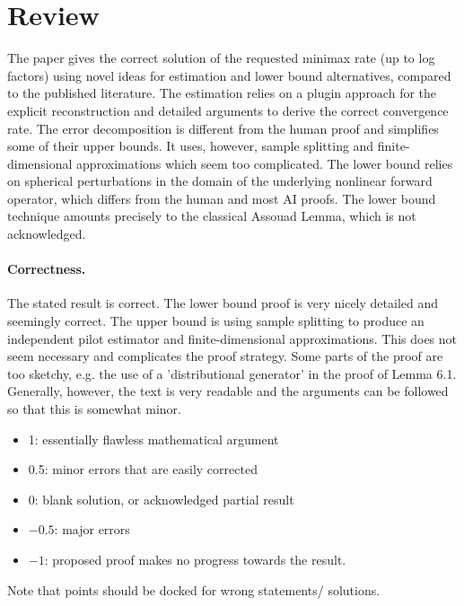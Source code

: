 \documentclass[11pt]{article}
\theoremstyle{remark}
\begin{document}
\maketitle

\section{Review}

The paper gives the correct solution of the requested minimax rate (up to log factors) using novel ideas for estimation and lower bound alternatives, compared to the published literature. The estimation relies on a plugin approach for the explicit reconstruction and detailed arguments to derive the correct convergence rate. The error decomposition is different from the human proof and simplifies some of their upper bounds. It uses, however, sample splitting and finite-dimensional approximations which seem too complicated.  The lower bound relies on spherical perturbations in the domain of the underlying nonlinear forward operator, which differs from the human and most AI proofs. The lower bound technique amounts precisely to the classical Assouad Lemma, which is not acknowledged. 


\paragraph{Correctness.}

The stated result is correct. The lower bound proof is very nicely detailed and seemingly correct. The upper bound is using sample splitting to produce an independent pilot estimator and finite-dimensional approximations. This does not seem necessary and complicates the proof strategy. Some parts of the proof are too sketchy, e.g. the use of a 'distributional generator' in the proof of Lemma 6.1. Generally, however, the text is very readable and the arguments can be followed so that this is somewhat minor.

\begin{itemize}
	\item  1: essentially flawless mathematical argument
	\item  0.5: minor errors that are easily corrected
	\item  0: blank solution, or acknowledged partial result
	\item  $-0.5$: major errors
	\item  $-1$: proposed proof makes no progress towards the result.
\end{itemize}
Note that points should be docked for wrong statements/ solutions.
\end{document}
